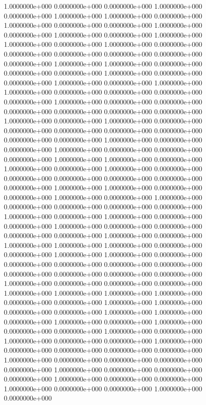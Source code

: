   1.0000000e+000  0.0000000e+000  0.0000000e+000  1.0000000e+000  0.0000000e+000
  1.0000000e+000  1.0000000e+000  0.0000000e+000  1.0000000e+000  0.0000000e+000
  0.0000000e+000  1.0000000e+000  0.0000000e+000  1.0000000e+000  0.0000000e+000
  1.0000000e+000  1.0000000e+000  0.0000000e+000  1.0000000e+000  0.0000000e+000
  0.0000000e+000  0.0000000e+000  0.0000000e+000  0.0000000e+000  0.0000000e+000
  1.0000000e+000  1.0000000e+000  0.0000000e+000  0.0000000e+000  0.0000000e+000
  1.0000000e+000  0.0000000e+000  0.0000000e+000  1.0000000e+000  0.0000000e+000
  1.0000000e+000  1.0000000e+000  0.0000000e+000  0.0000000e+000  0.0000000e+000
  0.0000000e+000  1.0000000e+000  0.0000000e+000  0.0000000e+000  0.0000000e+000
  0.0000000e+000  0.0000000e+000  0.0000000e+000  1.0000000e+000  0.0000000e+000
  1.0000000e+000  0.0000000e+000  0.0000000e+000  0.0000000e+000  0.0000000e+000
  0.0000000e+000  0.0000000e+000  0.0000000e+000  1.0000000e+000  0.0000000e+000
  0.0000000e+000  1.0000000e+000  0.0000000e+000  0.0000000e+000  0.0000000e+000
  1.0000000e+000  1.0000000e+000  0.0000000e+000  1.0000000e+000  0.0000000e+000
  1.0000000e+000  0.0000000e+000  0.0000000e+000  0.0000000e+000  0.0000000e+000
  0.0000000e+000  0.0000000e+000  1.0000000e+000  1.0000000e+000  0.0000000e+000
  0.0000000e+000  1.0000000e+000  0.0000000e+000  1.0000000e+000  0.0000000e+000
  0.0000000e+000  0.0000000e+000  0.0000000e+000  1.0000000e+000  0.0000000e+000
  1.0000000e+000  0.0000000e+000  0.0000000e+000  1.0000000e+000  0.0000000e+000
  0.0000000e+000  0.0000000e+000  0.0000000e+000  1.0000000e+000  0.0000000e+000
  1.0000000e+000  1.0000000e+000  1.0000000e+000  0.0000000e+000  0.0000000e+000
  1.0000000e+000  1.0000000e+000  0.0000000e+000  0.0000000e+000  0.0000000e+000
  0.0000000e+000  0.0000000e+000  0.0000000e+000  0.0000000e+000  0.0000000e+000
  0.0000000e+000  1.0000000e+000  0.0000000e+000  0.0000000e+000  0.0000000e+000
  1.0000000e+000  1.0000000e+000  1.0000000e+000  1.0000000e+000  0.0000000e+000
  0.0000000e+000  1.0000000e+000  1.0000000e+000  0.0000000e+000  0.0000000e+000
  1.0000000e+000  1.0000000e+000  0.0000000e+000  1.0000000e+000  0.0000000e+000
  1.0000000e+000  0.0000000e+000  0.0000000e+000  1.0000000e+000  0.0000000e+000
  1.0000000e+000  0.0000000e+000  0.0000000e+000  1.0000000e+000  0.0000000e+000
  0.0000000e+000  0.0000000e+000  0.0000000e+000  1.0000000e+000  0.0000000e+000
  0.0000000e+000  0.0000000e+000  0.0000000e+000  1.0000000e+000  0.0000000e+000
  0.0000000e+000  0.0000000e+000  1.0000000e+000  0.0000000e+000  0.0000000e+000
  1.0000000e+000  0.0000000e+000  0.0000000e+000  1.0000000e+000  0.0000000e+000
